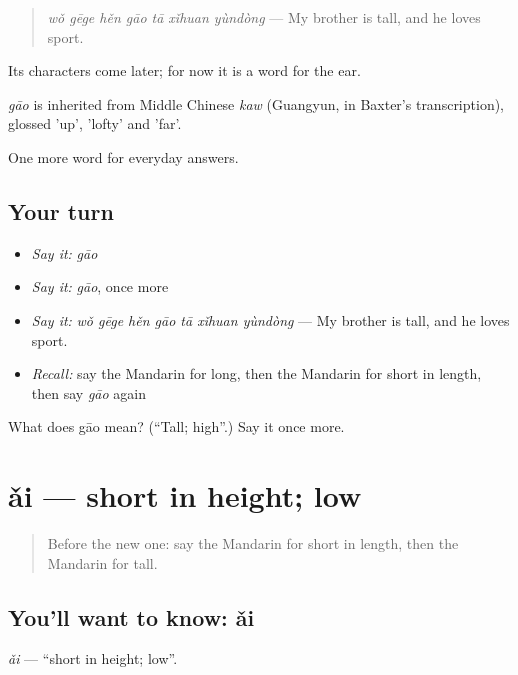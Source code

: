 \begin{quote}
\emph{wǒ gēge hěn gāo tā xǐhuan yùndòng} — My brother is tall, and he loves sport.
\end{quote}

Its characters come later; for now it is a word for the ear.

\begin{cousinweb}
\emph{gāo} is inherited from Middle Chinese \emph{kaw} (Guangyun, in Baxter's transcription), glossed 'up', 'lofty' and 'far'.
\end{cousinweb}

\begin{grammarlens}[title={What you've built}]
One more word for everyday answers.
\end{grammarlens}

\subsection*{Your turn}
\begin{itemize}
\raggedright
  \item \emph{Say it:} \emph{gāo}
  \item \emph{Say it:} \emph{gāo}, once more
  \item \emph{Say it:} \emph{wǒ gēge hěn gāo tā xǐhuan yùndòng} — My brother is tall, and he loves sport.
  \item \emph{Recall:} say the Mandarin for long, then the Mandarin for short in length, then say \emph{gāo} again
\end{itemize}

\begin{tcolorbox}[breakable,colback=teal!4,colframe=teal!35!black,title={Before you move on}]
What does gāo mean? (\textquotedblleft{}Tall; high\textquotedblright{}.) Say it once more.
\end{tcolorbox}
\section[ǎi]{ǎi — short in height; low}

\label{lesson:ZH-C61-ai}



\begin{quote}
Before the new one: say the Mandarin for short in length, then the Mandarin for tall.
\end{quote}

\subsection*{You'll want to know: ǎi}
\emph{ǎi} — \textquotedblleft{}short in height; low\textquotedblright{}.

